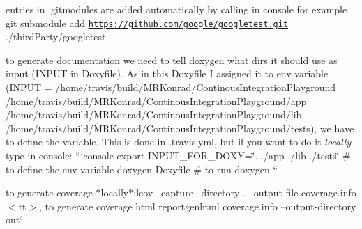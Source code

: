 \begin{DoxyItemize}
\item entries in {\ttfamily .gitmodules} are added automatically by calling in console for example {\ttfamily git submodule add \href{https://github.com/google/googletest.git}{\tt https\-://github.\-com/google/googletest.\-git} ./third\-Party/googletest}
\begin{DoxyItemize}
\item to generate documentation we need to tell doxygen what dirs it should use as input ({\ttfamily I\-N\-P\-U\-T} in Doxyfile). As in this Doxyfile I assigned it to env variable ({\ttfamily I\-N\-P\-U\-T = /home/travis/build/\-M\-R\-Konrad/\-Continous\-Integration\-Playground /home/travis/build/\-M\-R\-Konrad/\-Continous\-Integration\-Playground/app /home/travis/build/\-M\-R\-Konrad/\-Continous\-Integration\-Playground/lib /home/travis/build/\-M\-R\-Konrad/\-Continous\-Integration\-Playground/tests}), we have to define the variable. This is done in {\ttfamily .travis.\-yml}, but if you want to do it {\itshape locally} type in console\-: ```console export I\-N\-P\-U\-T\-\_\-\-F\-O\-R\-\_\-\-D\-O\-X\-Y=\char`\"{}. ./app ./lib ./tests\char`\"{} \# to define the env variable doxygen Doxyfile \# to run doxygen ``{\ttfamily }
\end{DoxyItemize}
\item {\ttfamily to generate coverage $\ast$locally$\ast$\-:}lcov --capture --directory . --output-\/file coverage.\-info$<$tt$>$, to generate coverage html reportgenhtml coverage.\-info --output-\/directory out` 
\end{DoxyItemize}